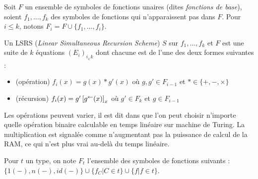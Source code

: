 			
			\begin{definition}[LSRS]
				\label{def:LSRS}
				Soit $F$ un ensemble de symboles de fonctions unaires (dites \emph{fonctions de base}), soient $f_1, \dots, f_k$ des symboles de fonctions qui n'apparaissent pas dans $F$. Pour $i\leqslant k$, notons $F_i = F\cup \{f_1, \dots, f_i\}$. 
				
				Un LSRS (\emph{Linear Simultaneous Recursion Scheme}) $S$ sur $f_1, \dots, f_k$ et $F$ est une suite de $k$ équations $\left(E_i\right)_{i_\in k}$ dont chacune est de l'une des deux formes suivantes :
				
				\begin{itemize}
					\item 	(opération) 		$f_i(x) = g(x) * g'(x)$ où $g,g' \in F_{i-1}$ et $* \in \{+, -, \times \}$
					
					\item 	(récursion)			$f_i(x) = g'\left[ g^{\leftarrow}(x) \right]_{x}$ où $g' \in F_k$ et $g \in F_{i-1}$
				\end{itemize}
			
			\end{definition}
			
			\begin{remark}
				Les opérations peuvent varier, il est dit dans \cite{GrandjeanSchwentick2002} que l'on peut choisir n'importe quelle opération binaire calculable en temps linéaire sur machine de Turing. La multiplication est signalée comme n'augmentant pas la puissance de calcul de la RAM, ce qui n'est plus vrai au-delà du temps linéaire.
			\end{remark}
			
			
			
			Pour $t$ un type, on note $F_t$ l'ensemble des symboles de fonctions suivants : $\{1(-), n(-), id(-)\} \cup  \{ f_C | C \in t\} \cup \{ f | f \in t\}$.
			

